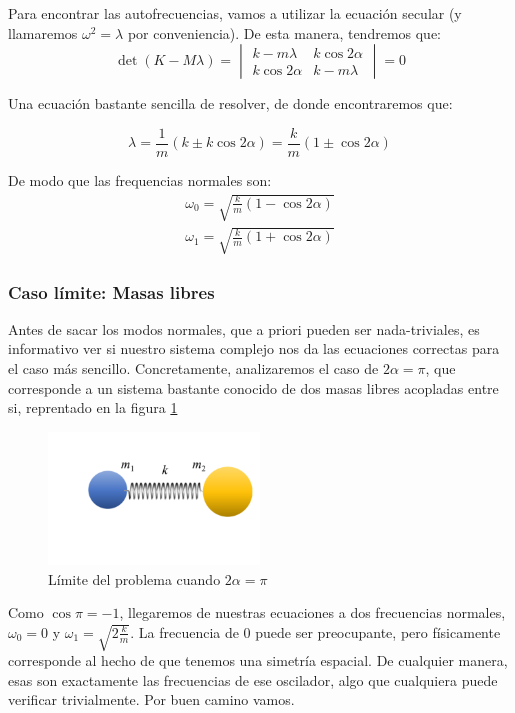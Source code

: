 \documentclass[a4paper,12pt]{article}
\begin{document}
Para encontrar las autofrecuencias, vamos a utilizar la ecuación secular (y llamaremos $\omega^2 = \lambda$ por conveniencia). De esta manera, tendremos que:
\begin{equation}
\det\left(K - M \lambda\right) = \begin{vmatrix}
  k-m\lambda & k\cos{2\alpha}\\ k\cos{2\alpha}&k-m\lambda
\end{vmatrix}=0
\end{equation}

Una ecuación bastante sencilla de resolver, de donde encontraremos que:

$$\lambda = \frac{1}{m} (k \pm k\cos{2\alpha}) = \frac{k}{m} (1\pm \cos{2\alpha})$$

De modo que las frequencias normales son:
\begin{equation}
  \begin{aligned}
  \omega_0 = \sqrt{ \frac{k}{m} (1 - \cos{2\alpha})}\\
  \omega_1 = \sqrt{ \frac{k}{m} (1 + \cos{2\alpha})}
  \end{aligned}
\end{equation}
\subsubsection*{Caso límite: Masas libres}

Antes de sacar los modos normales, que a priori pueden ser nada-triviales, es informativo ver si nuestro sistema complejo nos da las ecuaciones correctas para el caso más sencillo. Concretamente, analizaremos el caso de $2\alpha = \pi$, que corresponde a un sistema bastante conocido de dos masas libres acopladas entre si, reprentado en la figura \ref{masamuelle}

\begin{figure}[h]
  \centering
  \caption{Límite del problema cuando $2\alpha = \pi$}
  \label{masamuelle}
  \includegraphics[width=0.5\textwidth]{masamuelle.png}
\end{figure}

Como $\cos{\pi} = -1$, llegaremos de nuestras ecuaciones a dos frecuencias normales, $\omega_0 = 0$ y $\omega_1 = \sqrt{2\frac{k}{m}}$. La frecuencia de 0 puede ser preocupante, pero físicamente corresponde al hecho de que tenemos una simetría espacial. De cualquier manera, esas son exactamente las frecuencias de ese oscilador, algo que cualquiera puede verificar trivialmente. Por buen camino vamos. 
\end{document}
